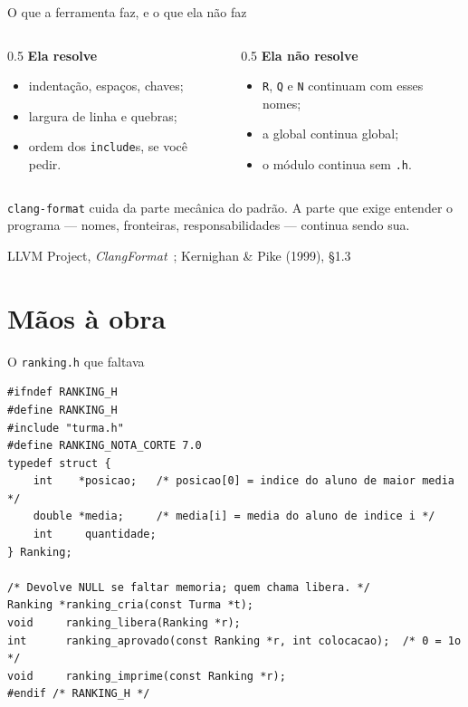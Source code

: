 \documentclass[aspectratio=169]{beamer}
\newcommand{\fonte}[1]{\vfill\hfill{\scriptsize\textcolor{UFSGray}{#1}}}
\begin{document}
\begin{frame}{O que a ferramenta faz, e o que ela não faz}
  \begin{columns}[T]
    \begin{column}{0.5\textwidth}
      \textcolor{UFSBlue}{\textbf{Ela resolve}}
      \begin{itemize}
        \item indentação, espaços, chaves;
        \item largura de linha e quebras;
        \item ordem dos \texttt{include}s, se você pedir.
      \end{itemize}
    \end{column}
    \begin{column}{0.5\textwidth}
      \textcolor{UFSRed}{\textbf{Ela não resolve}}
      \begin{itemize}
        \item \texttt{R}, \texttt{Q} e \texttt{N} continuam com esses nomes;
        \item a global continua global;
        \item o módulo continua sem \texttt{.h}.
      \end{itemize}
    \end{column}
  \end{columns}
  \begin{block}{}
    \small \texttt{clang-format} cuida da parte mecânica do padrão. A parte
    que exige entender o programa --- nomes, fronteiras, responsabilidades
    --- continua sendo sua.
  \end{block}
  \fonte{LLVM Project, \emph{ClangFormat}~\cite{llvm2024clangformat}; Kernighan \& Pike (1999), §1.3~\cite{kernighan1999practice}}
\end{frame}

\section{Mãos à obra}

\begin{frame}[fragile]{O \texttt{ranking.h} que faltava}
\begin{lstlisting}[style=tinyC]
#ifndef RANKING_H
#define RANKING_H
#include "turma.h"
#define RANKING_NOTA_CORTE 7.0
typedef struct {
    int    *posicao;   /* posicao[0] = indice do aluno de maior media */
    double *media;     /* media[i] = media do aluno de indice i */
    int     quantidade;
} Ranking;

/* Devolve NULL se faltar memoria; quem chama libera. */
Ranking *ranking_cria(const Turma *t);
void     ranking_libera(Ranking *r);
int      ranking_aprovado(const Ranking *r, int colocacao);  /* 0 = 1o */
void     ranking_imprime(const Ranking *r);
#endif /* RANKING_H */
\end{lstlisting}
\end{frame}
\end{document}
